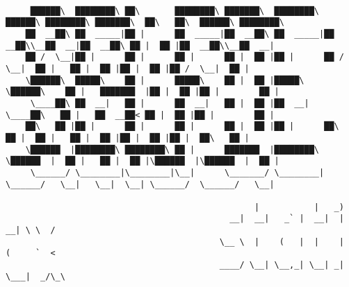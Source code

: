 \documentclass[varwidth=\maxdimen,margin=0.5cm,multi={verbatim}]{standalone}
\begin{document}
\begin{verbatim}

     ██████\  ████████\ ██\       ████████\ ███████\  ████████\  ██████\ ████████\ ███████\  ██\   ██\  ██████\ ████████\ 
    ██  __██\ ██  _____|██ |      ██  _____|██  __██\ ██  _____|██  __██\\__██  __|██  __██\ ██ |  ██ |██  __██\\__██  __|
    ██ /  \__|██ |      ██ |      ██ |      ██ |  ██ |██ |      ██ /  \__|  ██ |   ██ |  ██ |██ |  ██ |██ /  \__|  ██ |   
    \██████\  █████\    ██ |      █████\    ██ |  ██ |█████\    \██████\    ██ |   ███████  |██ |  ██ |██ |        ██ |   
     \____██\ ██  __|   ██ |      ██  __|   ██ |  ██ |██  __|    \____██\   ██ |   ██  __██< ██ |  ██ |██ |        ██ |   
    ██\   ██ |██ |      ██ |      ██ |      ██ |  ██ |██ |      ██\   ██ |  ██ |   ██ |  ██ |██ |  ██ |██ |  ██\   ██ |   
    \██████  |████████\ ████████\ ██ |      ███████  |████████\ \██████  |  ██ |   ██ |  ██ |\██████  |\██████  |  ██ |   
     \______/ \________|\________|\__|      \_______/ \________| \______/   \__|   \__|  \__| \______/  \______/   \__|

                                                  |           |   _)              
                                             __|  __|   _` |  __|  |   __| \ \  / 
                                           \__ \  |    (   |  |    |  (     `  <  
                                           ____/ \__| \__,_| \__| _| \___|  _/\_\



\end{verbatim}
\end{document}
